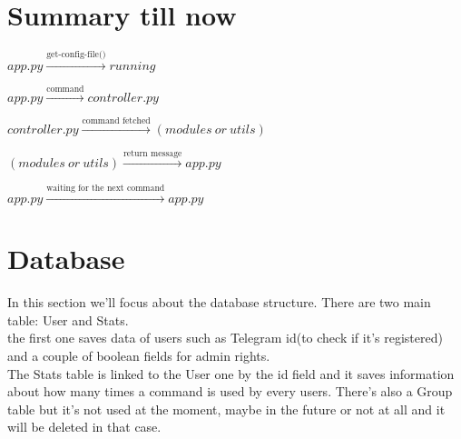 \documentclass{article}
\begin{document}
\section{Summary till now}
\begin{center} $app.py \xrightarrow{\text{get-config-file()}} running$ \end{center}
\begin{center} $app.py \xrightarrow{\text{command}} controller.py$ \end{center}
\begin{center} $controller.py \xrightarrow{\text{command fetched}} (modules \ or  \ utils)$ \end{center}
\begin{center} $(modules \ or \ utils) \xrightarrow{\text{return message}} app.py$ \end{center}
\begin{center} $app.py \xrightarrow{\text{waiting for the next command}} app.py$ \end{center}

\section{Database}
In this section we'll focus about the database structure. There are two main table: User and Stats. \\ 
the first one saves data of users such as Telegram id(to check if it's registered) and a couple of boolean fields for admin rights.\\
The Stats table is linked to the User one by the id field and it saves information about how many times a command is used by every users.
There's also a Group table but it's not used at the moment, maybe in the future or not at all and it will be deleted in that case.\\

\end{document}
